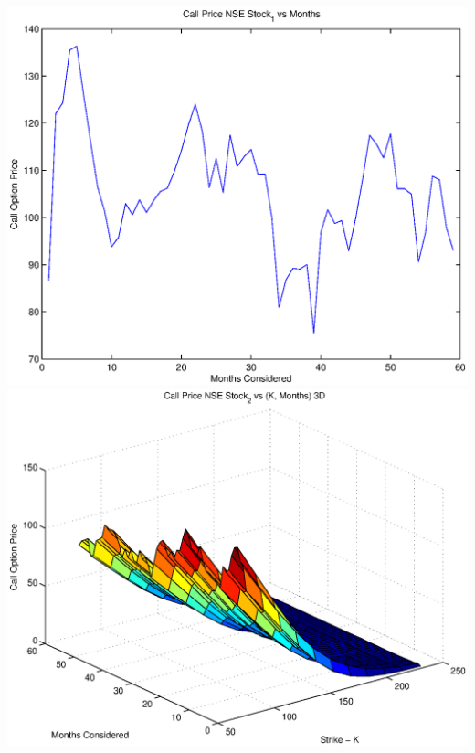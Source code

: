 \documentclass{article}
\begin{document}
\includegraphics[width=\textwidth]{Call_Price_NSE_Stock_1_vs_Months} \\

\includegraphics[width=\textwidth]{Call_Price_NSE_Stock_2_vs_(K,_Months)_3D} \\
\end{document}
